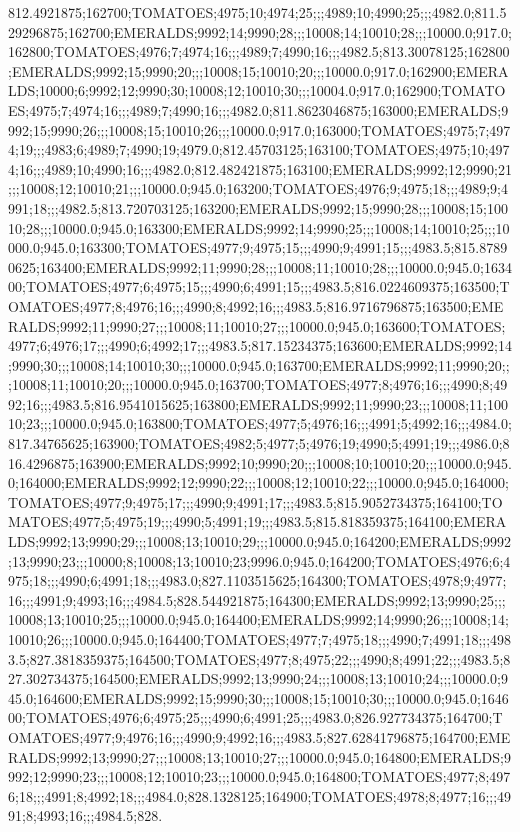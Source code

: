 812.4921875;162700;TOMATOES;4975;10;4974;25;;;4989;10;4990;25;;;4982.0;811.529296875;162700;EMERALDS;9992;14;9990;28;;;10008;14;10010;28;;;10000.0;917.0;162800;TOMATOES;4976;7;4974;16;;;4989;7;4990;16;;;4982.5;813.30078125;162800;EMERALDS;9992;15;9990;20;;;10008;15;10010;20;;;10000.0;917.0;162900;EMERALDS;10000;6;9992;12;9990;30;10008;12;10010;30;;;10004.0;917.0;162900;TOMATOES;4975;7;4974;16;;;4989;7;4990;16;;;4982.0;811.8623046875;163000;EMERALDS;9992;15;9990;26;;;10008;15;10010;26;;;10000.0;917.0;163000;TOMATOES;4975;7;4974;19;;;4983;6;4989;7;4990;19;4979.0;812.45703125;163100;TOMATOES;4975;10;4974;16;;;4989;10;4990;16;;;4982.0;812.482421875;163100;EMERALDS;9992;12;9990;21;;;10008;12;10010;21;;;10000.0;945.0;163200;TOMATOES;4976;9;4975;18;;;4989;9;4991;18;;;4982.5;813.720703125;163200;EMERALDS;9992;15;9990;28;;;10008;15;10010;28;;;10000.0;945.0;163300;EMERALDS;9992;14;9990;25;;;10008;14;10010;25;;;10000.0;945.0;163300;TOMATOES;4977;9;4975;15;;;4990;9;4991;15;;;4983.5;815.87890625;163400;EMERALDS;9992;11;9990;28;;;10008;11;10010;28;;;10000.0;945.0;163400;TOMATOES;4977;6;4975;15;;;4990;6;4991;15;;;4983.5;816.0224609375;163500;TOMATOES;4977;8;4976;16;;;4990;8;4992;16;;;4983.5;816.9716796875;163500;EMERALDS;9992;11;9990;27;;;10008;11;10010;27;;;10000.0;945.0;163600;TOMATOES;4977;6;4976;17;;;4990;6;4992;17;;;4983.5;817.15234375;163600;EMERALDS;9992;14;9990;30;;;10008;14;10010;30;;;10000.0;945.0;163700;EMERALDS;9992;11;9990;20;;;10008;11;10010;20;;;10000.0;945.0;163700;TOMATOES;4977;8;4976;16;;;4990;8;4992;16;;;4983.5;816.9541015625;163800;EMERALDS;9992;11;9990;23;;;10008;11;10010;23;;;10000.0;945.0;163800;TOMATOES;4977;5;4976;16;;;4991;5;4992;16;;;4984.0;817.34765625;163900;TOMATOES;4982;5;4977;5;4976;19;4990;5;4991;19;;;4986.0;816.4296875;163900;EMERALDS;9992;10;9990;20;;;10008;10;10010;20;;;10000.0;945.0;164000;EMERALDS;9992;12;9990;22;;;10008;12;10010;22;;;10000.0;945.0;164000;TOMATOES;4977;9;4975;17;;;4990;9;4991;17;;;4983.5;815.9052734375;164100;TOMATOES;4977;5;4975;19;;;4990;5;4991;19;;;4983.5;815.818359375;164100;EMERALDS;9992;13;9990;29;;;10008;13;10010;29;;;10000.0;945.0;164200;EMERALDS;9992;13;9990;23;;;10000;8;10008;13;10010;23;9996.0;945.0;164200;TOMATOES;4976;6;4975;18;;;4990;6;4991;18;;;4983.0;827.1103515625;164300;TOMATOES;4978;9;4977;16;;;4991;9;4993;16;;;4984.5;828.544921875;164300;EMERALDS;9992;13;9990;25;;;10008;13;10010;25;;;10000.0;945.0;164400;EMERALDS;9992;14;9990;26;;;10008;14;10010;26;;;10000.0;945.0;164400;TOMATOES;4977;7;4975;18;;;4990;7;4991;18;;;4983.5;827.3818359375;164500;TOMATOES;4977;8;4975;22;;;4990;8;4991;22;;;4983.5;827.302734375;164500;EMERALDS;9992;13;9990;24;;;10008;13;10010;24;;;10000.0;945.0;164600;EMERALDS;9992;15;9990;30;;;10008;15;10010;30;;;10000.0;945.0;164600;TOMATOES;4976;6;4975;25;;;4990;6;4991;25;;;4983.0;826.927734375;164700;TOMATOES;4977;9;4976;16;;;4990;9;4992;16;;;4983.5;827.62841796875;164700;EMERALDS;9992;13;9990;27;;;10008;13;10010;27;;;10000.0;945.0;164800;EMERALDS;9992;12;9990;23;;;10008;12;10010;23;;;10000.0;945.0;164800;TOMATOES;4977;8;4976;18;;;4991;8;4992;18;;;4984.0;828.1328125;164900;TOMATOES;4978;8;4977;16;;;4991;8;4993;16;;;4984.5;828.